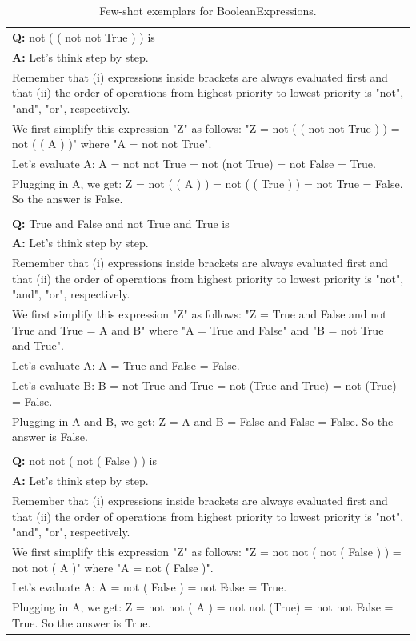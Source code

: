 \begin{table}[H]
    \caption{Few-shot exemplars for BooleanExpressions.}
    \label{tab:booleanexpressions}
    \centering
    \begin{tabularx}{\columnwidth}{@{}X@{}}
        \toprule
        \textbf{Q:} not ( ( not not True ) ) is \\
        \textbf{A:} Let's think step by step. \\
        Remember that (i) expressions inside brackets are always evaluated first and that (ii) the order of operations from highest priority to lowest priority is "not", "and", "or", respectively. \\
        We first simplify this expression "Z" as follows: "Z = not ( ( not not True ) ) = not ( ( A ) )" where "A = not not True". \\
        Let's evaluate A: A = not not True = not (not True) = not False = True. \\
        Plugging in A, we get: Z = not ( ( A ) ) = not ( ( True ) ) = not True = False. So the answer is False. \\ \\
        
        \textbf{Q:} True and False and not True and True is \\
        \textbf{A:} Let's think step by step. \\
        Remember that (i) expressions inside brackets are always evaluated first and that (ii) the order of operations from highest priority to lowest priority is "not", "and", "or", respectively. \\
        We first simplify this expression "Z" as follows: "Z = True and False and not True and True = A and B" where "A = True and False" and "B = not True and True". \\
        Let's evaluate A: A = True and False = False. \\
        Let's evaluate B: B = not True and True = not (True and True) = not (True) = False. \\
        Plugging in A and B, we get: Z = A and B = False and False = False. So the answer is False. \\ \\
        
        \textbf{Q:} not not ( not ( False ) ) is \\
        \textbf{A:} Let's think step by step. \\
        Remember that (i) expressions inside brackets are always evaluated first and that (ii) the order of operations from highest priority to lowest priority is "not", "and", "or", respectively. \\
        We first simplify this expression "Z" as follows: "Z = not not ( not ( False ) ) = not not ( A )" where "A = not ( False )". \\
        Let's evaluate A: A = not ( False ) = not False = True. \\
        Plugging in A, we get: Z = not not ( A ) = not not (True) = not not False = True. So the answer is True. \\
        \bottomrule
    \end{tabularx}
\end{table}


